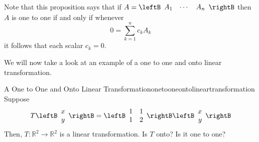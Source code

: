 Note that this proposition says that if $A=\leftB
\begin{array}{ccc}
A_{1} & \cdots & A_{n}
\end{array}
\rightB $ then $A$ is one to one if and only if whenever
\begin{equation*}
0 = \sum_{k=1}^{n}c_{k}A_{k}
\end{equation*}
it follows that each scalar $c_{k}=0$. 

We will now take a look at an example of a one to one and onto linear transformation. 

\begin{example}{A One to One and Onto Linear Transformation}{onetooneontolineartransformation}
Suppose
\begin{equation*}
T\leftB
\begin{array}{c}
x \\
y
\end{array}
\rightB =\leftB
\begin{array}{rr}
1 & 1 \\
1 & 2
\end{array}
\rightB \leftB
\begin{array}{r}
x \\
y
\end{array}
\rightB
\end{equation*}
Then, $T:\mathbb{R}^{2}\rightarrow \mathbb{R}^{2}$ is a linear
transformation. Is $T$ onto? Is it one to one?
\end{example}

